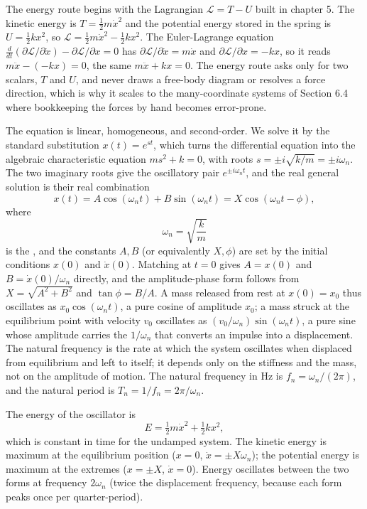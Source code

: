 The energy route begins with the Lagrangian $\mathcal{L} = T - U$ built
in chapter 5. The kinetic energy is $T = \tfrac12 m\dot{x}^2$ and the
potential energy stored in the spring is $U = \tfrac12 k x^2$, so
$\mathcal{L} = \tfrac12 m\dot{x}^2 - \tfrac12 k x^2$. The
Euler-Lagrange equation $\frac{d}{dt}\!\left(\partial\mathcal{L}/
\partial\dot{x}\right) - \partial\mathcal{L}/\partial x = 0$ has
$\partial\mathcal{L}/\partial\dot{x} = m\dot{x}$ and
$\partial\mathcal{L}/\partial x = -kx$, so it reads $m\ddot{x} -
(-kx) = 0$, the same $m\ddot{x} + kx = 0$. The energy route asks only
for two scalars, $T$ and $U$, and never draws a free-body diagram or
resolves a force direction, which is why it scales to the many-coordinate
systems of Section 6.4 where bookkeeping the forces by hand becomes
error-prone.

The equation is linear, homogeneous, and second-order. We solve it by
the standard substitution $x(t) = e^{st}$, which turns the differential
equation into the algebraic characteristic equation $ms^2 + k = 0$,
with roots $s = \pm i\sqrt{k/m} = \pm i\omega_n$. The two imaginary
roots give the oscillatory pair $e^{\pm i\omega_n t}$, and the real
general solution is their real combination
\[
x(t) = A\cos(\omega_n t) + B\sin(\omega_n t) = X\cos(\omega_n t -
\phi),
\]
where
\[
\omega_n = \sqrt{\frac{k}{m}}
\]
is the , and the constants $A,
B$ (or equivalently $X, \phi$) are set by the initial conditions
$x(0)$ and $\dot{x}(0)$. Matching at $t = 0$ gives $A = x(0)$ and $B =
\dot{x}(0)/\omega_n$ directly, and the amplitude-phase form follows from
$X = \sqrt{A^2 + B^2}$ and $\tan\phi = B/A$. A mass released from rest
at $x(0) = x_0$ thus oscillates as $x_0\cos(\omega_n t)$, a pure cosine
of amplitude $x_0$; a mass struck at the equilibrium point with velocity
$v_0$ oscillates as $(v_0/\omega_n)\sin(\omega_n t)$, a pure sine whose
amplitude carries the $1/\omega_n$ that converts an impulse into a
displacement. The natural frequency is the rate at which
the system oscillates when displaced from equilibrium and left to
itself; it depends only on the stiffness and the mass, not on the
amplitude of motion. The natural frequency in Hz is $f_n = \omega_n /
(2\pi)$, and the natural period is $T_n = 1/f_n = 2\pi/\omega_n$.

The energy of the oscillator is
\[
E = \tfrac{1}{2} m \dot{x}^2 + \tfrac{1}{2} k x^2,
\]
which is constant in time for the undamped system. The kinetic
energy is maximum at the equilibrium position ($x = 0$, $\dot{x} =
\pm X\omega_n$); the potential energy is maximum at the extremes ($x
= \pm X$, $\dot{x} = 0$). Energy oscillates between the two forms
at frequency $2 \omega_n$ (twice the displacement frequency, because
each form peaks once per quarter-period).

